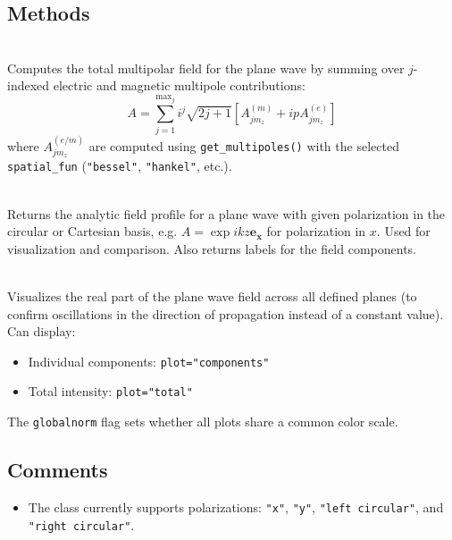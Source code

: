 \subsection{Methods}
\begin{description}[leftmargin=4cm]
    \item[\texttt{compute\_sum(spatial\_fun="bessel")}] \hfill \\
    Computes the total multipolar field for the plane wave by summing over \( j \)-indexed electric and magnetic multipole contributions:
    \begin{equation}
    A = \sum_{j=1}^{{\text{max}_j}} i^j \sqrt{2j+1} \left[ A_{j m_z}^{(m)} + i p A_{j m_z}^{(e)} \right]
    \end{equation}
    where \( A_{j m_z}^{(e/m)} \) are computed using \texttt{get\_multipoles()} with the selected \texttt{spatial\_fun} (\texttt{"bessel"}, \texttt{"hankel"}, etc.).

    \item[\texttt{compute\_pol()}] \hfill \\
    Returns the analytic field profile for a plane wave with given polarization in the circular or Cartesian basis, e.g. $A=\exp{ikz}\mathbf{e_x}$ for polarization in $x$. Used for visualization and comparison. Also returns labels for the field components.

    \item[\texttt{plot\_beam(plot="components", globalnorm=False)}] \hfill \\
    Visualizes the real part of the plane wave field across all defined planes (to confirm oscillations in the direction of propagation instead of a constant value). Can display:
    \begin{itemize}
        \item Individual components: \texttt{plot="components"}
        \item Total intensity: \texttt{plot="total"}
    \end{itemize}
    The \texttt{globalnorm} flag sets whether all plots share a common color scale.

\end{description}

\subsection{Comments}
\begin{itemize}
    \item The class currently supports polarizations: \texttt{"x"}, \texttt{"y"}, \texttt{"left circular"}, and \texttt{"right circular"}.
\end{itemize}
